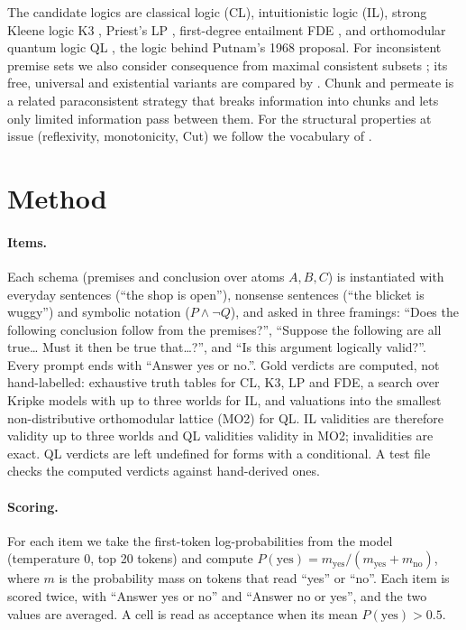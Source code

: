\documentclass[11pt]{article}
\begin{document}
The candidate logics are classical logic (CL), intuitionistic logic (IL), strong Kleene logic K3
\citep{kleene1952}, Priest's LP \citep{priest1979}, first-degree entailment FDE \citep{dunn1976}, and
orthomodular quantum logic QL \citep{birkhoff1936}, the logic behind Putnam's 1968 proposal. For
inconsistent premise sets we also consider consequence from maximal consistent subsets
\citep{rescher1970}; its free, universal and existential variants are compared by
\citet{benferhat1997}. Chunk and permeate \citep{brown2004} is a related paraconsistent strategy that
breaks information into chunks and lets only limited information pass between them. For the structural
properties at issue (reflexivity, monotonicity, Cut) we follow the vocabulary of \citet{kraus1990}.

\section{Method}

\paragraph{Items.}
Each schema (premises and conclusion over atoms $A, B, C$) is instantiated with everyday sentences
(``the shop is open''), nonsense sentences (``the blicket is wuggy'') and symbolic notation ($P \land
\neg Q$), and asked in three framings: ``Does the following conclusion follow from the premises?'',
``Suppose the following are all true\ldots{} Must it then be true that\ldots?'', and ``Is this argument
logically valid?''. Every prompt ends with ``Answer yes or no.''. Gold verdicts are computed, not
hand-labelled: exhaustive truth tables for CL, K3, LP and FDE, a search over Kripke models with up to
three worlds for IL, and valuations into the smallest non-distributive orthomodular lattice (MO2) for
QL. IL validities are therefore validity up to three worlds and QL validities validity in MO2;
invalidities are exact. QL verdicts are left undefined for forms with a conditional. A test file checks
the computed verdicts against hand-derived ones.

\paragraph{Scoring.}
For each item we take the first-token log-probabilities from the model (temperature 0, top 20
tokens) and compute $P(\text{yes}) = m_{\text{yes}} / (m_{\text{yes}} + m_{\text{no}})$, where $m$ is the
probability mass on tokens that read ``yes'' or ``no''. Each item is scored twice, with ``Answer yes or
no'' and ``Answer no or yes'', and the two values are averaged. A cell is read as acceptance when its mean
$P(\text{yes}) > 0.5$.
\end{document}
